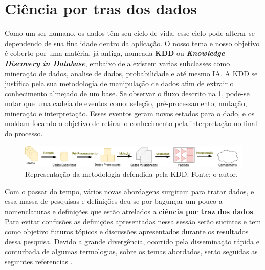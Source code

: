 \section{Ciência por tras dos dados}
Como um ser humano, os dados têm seu ciclo de vida, esse ciclo pode alterar-se dependendo de sua finalidade dentro da aplicação. O nosso tema e nosso objetivo é coberto por uma matéria, já antiga, nomeada \textbf{KDD} ou \textbf{\textit{Knowledge Discovery in Database}}, embaixo dela existem varias subclasses como mineração de dados, analise de dados, probabilidade e até mesmo IA. A KDD se justifica pela sua metodologia de manipulação de dados afim de extrair o conhecimento almejado de um base. Se observar o fluxo descrito na \ref{fig:kdd}, pode-se notar que uma cadeia de eventos como: seleção, pré-processamento, mutação, mineração e interpretação. Esses eventos geram novos estados para o dado, e os moldam focando o objetivo de retirar o conhecimento pela interpretação no final do processo.

\begin{figure}[H]
    \centering
    \includegraphics[width=.8\textwidth]{imagens/kdd.png}
    \caption{Representação da metodologia defendida pela KDD. Fonte: o autor.}
    \label{fig:kdd}
\end{figure}

Com o passar do tempo, vários novas abordagens surgiram para tratar dados, e essa massa de pesquisas e definições deu-se por bagunçar um pouco a nomenclaturas e definições que estão atrelados a \textbf{ciência por traz dos dados}. Para evitar confusões as definições apresentadas nessa sessão serão sucintas e tem como objetivo futuros tópicos e discussões apresentados durante os resultados dessa pesquisa. Devido a grande divergência, ocorrido pela disseminação rápida e conturbada de algumas termologias, sobre os temas abordados, serão seguidas as seguintes referencias \cite{laender2002brief, fayyad1996kdd, hand2007principles}.







